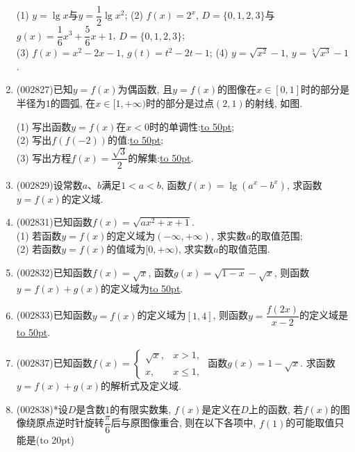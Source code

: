 \documentclass[10pt,a4paper]{article}
\newcommand{\blank}[1]{\underline{\hbox to #1pt{}}}
\newcommand{\bracket}[1]{(\hbox to #1pt{})}
\begin{document}
\begin{enumerate}[1.]
(1) $y=\lg x$与$y=\dfrac 12\lg {x^2}$; (2) $f(x)=2^x$, $D=\{0,1,2,3\}$与$g(x)=\dfrac 16{x^3}+\dfrac 56x+1$, $D=\{0,1,2,3\}$; \\
(3) $f(x)=x^2-2x-1$, $g(t)=t^2-2t-1$; (4) $y=\sqrt{x^2}-1$, $y=\sqrt[3]{x^3}-1$.
\item {\tiny (002827)}已知$y=f(x)$为偶函数, 且$y=f(x)$的图像在$x\in [0,1]$时的部分是半径为$1$的圆弧, 在$x\in [1,+\infty)$时的部分是过点$(2,1)$的射线, 如图.\\
\begin{center}
\end{center}
(1) 写出函数$y=f(x)$在$x<0$时的单调性:\blank{50};\\
(2) 写出$f(f(-2))$的值:\blank{50};\\
(3) 写出方程$f(x)=\dfrac{\sqrt 3}2$的解集:\blank{50}.
\item {\tiny (002829)}设常数$a$、$b$满足$1<a<b$, 函数$f(x)=\lg(a^x-b^x)$, 求函数$y=f(x)$的定义域.
\item {\tiny (002831)}已知函数$f(x)=\sqrt{ax^2+x+1}$.\\
(1) 若函数$y=f(x)$的定义域为$(-\infty ,+\infty)$, 求实数$a$的取值范围;\\
(2) 若函数$y=f(x)$的值域为$[0,+\infty)$, 求实数$a$的取值范围.
\item {\tiny (002832)}已知函数$f(x)=\sqrt x$, 函数$g(x)=\sqrt{1-x}-\sqrt x$, 则函数$y=f(x)+g(x)$的定义域为\blank{50}.
\item {\tiny (002833)}已知函数$y=f(x)$的定义域为$[1,4]$, 则函数$y=\dfrac{f(2x)}{x-2}$的定义域是\blank{50}.
\item {\tiny (002837)}已知函数$f(x)=\begin{cases} \sqrt x, & x>1, \\ x, &x\le 1,  \end{cases}$ 函数$g(x)=1-\sqrt x$. 求函数$y=f(x)+g(x)$的解析式及定义域.
\item {\tiny (002838)}*设$D$是含数$1$的有限实数集, $f(x)$是定义在$D$上的函数, 若$f(x)$的图像绕原点逆时针旋转$\dfrac \pi6$后与原图像重合, 则在以下各项中, $f(1)$的可能取值只能是\bracket{20}

\end{enumerate}
\end{document}
